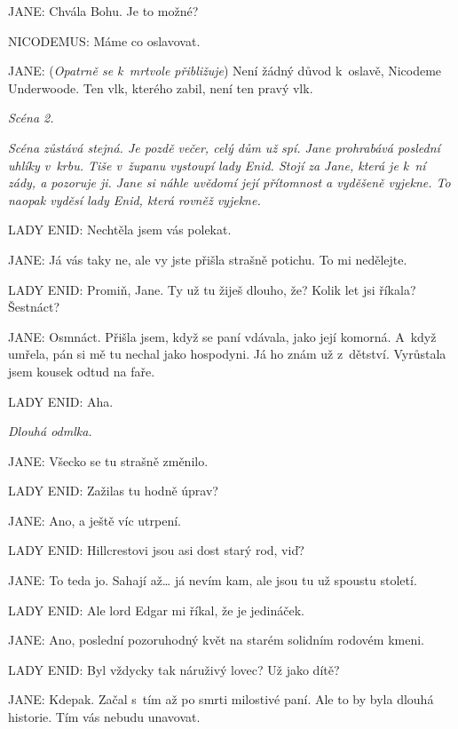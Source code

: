 \noindent
JANE: Chvála Bohu. Je to možné?

\noindent
NICODEMUS: Máme co oslavovat.

\noindent
JANE: (\textit{Opatrně se k mrtvole přibližuje}) Není žádný důvod k oslavě, Nicodeme Underwoode. Ten vlk, kterého zabil, není ten pravý vlk.

\bigskip

\noindent
\textit{Scéna 2.}

\medskip

\noindent
\textit{Scéna zůstává stejná. Je pozdě večer, celý dům už spí. Jane prohrabává poslední uhlíky v krbu. Tiše v županu vystoupí lady Enid. Stojí za Jane, která je k ní zády, a pozoruje ji. Jane si náhle uvědomí její přítomnost a vyděšeně vyjekne. To naopak vyděsí lady Enid, která rovněž vyjekne.}

\medskip

\noindent
LADY ENID: Nechtěla jsem vás polekat.

\noindent
JANE: Já vás taky ne, ale vy jste přišla strašně potichu. To mi nedělejte.

\noindent
LADY ENID: Promiň, Jane. Ty už tu žiješ dlouho, že? Kolik let jsi říkala? Šestnáct?

\noindent
JANE: Osmnáct. Přišla jsem, když se paní vdávala, jako její komorná. A~když umřela, pán si mě tu nechal jako hospodyni. Já ho znám už z dětství. Vyrůstala jsem kousek odtud na faře.

\noindent
LADY ENID: Aha.

\smallskip

\noindent
\textit{Dlouhá odmlka.}

\smallskip

\noindent
JANE: Všecko se tu strašně změnilo.

\noindent
LADY ENID: Zažilas tu hodně úprav?

\noindent
JANE: Ano, a ještě víc utrpení.

\noindent
LADY ENID: Hillcrestovi jsou asi dost starý rod, viď?

\noindent
JANE: To teda jo. Sahají až… já nevím kam, ale jsou tu už spoustu století.

\noindent
LADY ENID: Ale lord Edgar mi říkal, že je jedináček.

\noindent
JANE: Ano, poslední pozoruhodný květ na starém solidním rodovém kmeni.

\noindent
LADY ENID: Byl vždycky tak náruživý lovec? Už jako dítě?

\noindent
JANE: Kdepak. Začal s tím až po smrti milostivé paní. Ale to by byla dlouhá historie. Tím vás nebudu unavovat.

